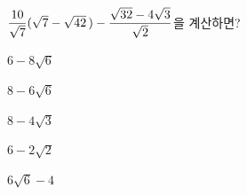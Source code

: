 $\dfrac{10}{\sqrt{7}}(\sqrt{7}-\sqrt{42}\mkern3mu )-\dfrac{\sqrt{32}-4\sqrt{3}}{\sqrt{2}}$을 계산하면?
\begin{choices32}{\rule[-3ex]{0pt}{8ex}$6-8\sqrt{6}$}{\rule[-3ex]{0pt}{8ex}$8-6\sqrt{6}$}{\rule[-3ex]{0pt}{8ex}$8-4\sqrt{3}$}{\rule[-3ex]{0pt}{8ex}$6-2\sqrt{2}$}{\rule[-3ex]{0pt}{8ex}$6\sqrt{6}-4$}\end{choices32}
